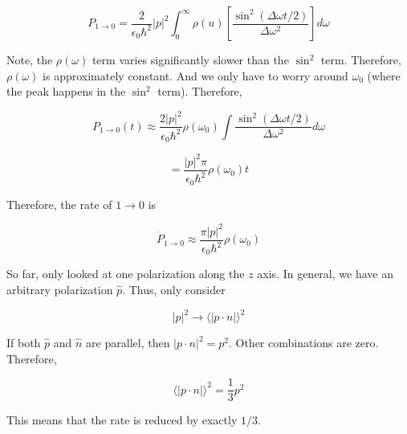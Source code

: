 \documentclass{article}
\newtheorem{one minute paper}[theorem]{One Minute Paper}
\begin{document}
\begin{equation}
    P_{1 \rightarrow 0} = \frac{2}{\epsilon_0 \hbar^2}|p|^2 \int_{0}^{\infty}\rho(u)\left[ \frac{\sin^2(\Delta \omega t/2)}{\Delta \omega^2} \right]d\omega
\end{equation}

Note, the $\rho(\omega)$ term varies significantly slower than the $\sin^2$ term. Therefore, $\rho(\omega)$ is approximately constant. And we only have to worry around $\omega_0$ (where the peak happens in the $\sin^2$ term). Therefore, 

\begin{equation}
    P_{1\rightarrow 0}(t) \approx \frac{2|p|^2}{\epsilon_0 \hbar^2}\rho(\omega_0)\int\frac{\sin^2(\Delta \omega t/2)}{\Delta \omega^2}d\omega
\end{equation}

\begin{equation}
    = \frac{|p|^2 \pi }{\epsilon_0 \hbar^2}\rho(\omega_0)t
\end{equation}

Therefore, the rate of $1 \rightarrow 0$ is 

\begin{equation}
    \dot{P}_{1 \rightarrow 0}\approx \frac{\pi|p|^2}{\epsilon_0 \hbar^2}\rho(\omega_0)
\end{equation}

So far, only looked at one polarization along the $z$ axis. In general, we have an arbitrary polarization $\hat{p}$. Thus, only consider 

\begin{equation}
    |p|^2 \rightarrow \langle |p \cdot n | \rangle^2
\end{equation}

If both $\hat{p}$ and $\hat{n}$ are parallel, then $|p \cdot n |^2 = p^2$. Other combinations are zero. Therefore, 

\begin{equation}
    \langle |p \cdot n | \rangle^2 = \frac{1}{3}p^2
\end{equation}

This means that the rate is reduced by exactly $1/3$. 
\end{document}
